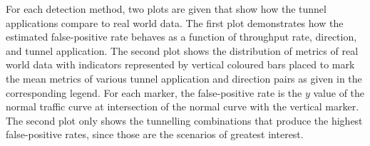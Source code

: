 \documentclass{llncs}
\begin{document}
For each detection method, two plots are given that show how the tunnel
applications compare to real world data. The first plot demonstrates how the estimated
false-positive rate behaves as a function of throughput rate, direction, and
tunnel application. The second plot shows the distribution of metrics of real
world data with indicators represented by vertical coloured bars placed to mark
the mean metrics of various tunnel application and direction pairs as given in
the corresponding legend. For each marker, the false-positive rate is the $y$
value of the normal traffic curve at intersection of the normal curve with the
vertical marker. The second plot only shows the tunnelling combinations that
produce the highest false-positive rates, since those are the scenarios of
greatest interest.

%
\end{document}
